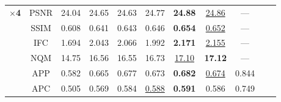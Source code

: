 \documentclass[10pt,twocolumn,letterpaper]{article}
\begin{document}
\begin{table} [tb]
{{\begin{tabular}{|l|c|cccccc|c|c|c|}
\textbf{$\times$4} & PSNR & 24.04 & 24.65 & 24.63 & 24.77 & \textbf{24.88} & \underline{24.86} & --- \\
            & SSIM & 0.608 & 0.641 & 0.643 & 0.646 & \textbf{0.654} & \underline{0.652} & --- \\
            & IFC & 1.694 & 2.043 & 2.066 & 1.992 & \textbf{2.171} & \underline{2.155} & --- \\
            & NQM & 14.75 & 16.56 & 16.55 & 16.73 & \underline{17.10} & \textbf{17.12} & --- \\
            \hline
            & APP & 0.582 & 0.665 & 0.677 & 0.673 & \textbf{0.682} & \underline{0.674} & 0.844 \\
            & APC & 0.505 & 0.569 & 0.584 & \underline{0.588} & \textbf{0.591} & 0.586 & 0.749 \\
\hline
\end{tabular}
}
\label{tab:il}}
\end{table}
\end{document}
